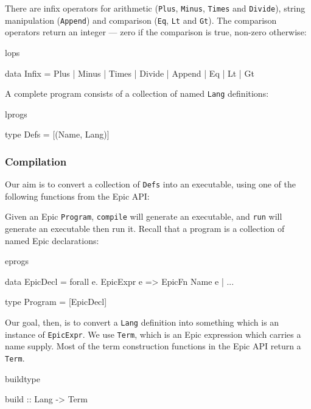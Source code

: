 \noindent
There are infix operators for arithmetic (\texttt{Plus},
\texttt{Minus}, \texttt{Times} and \texttt{Divide}), string
manipulation (\texttt{Append}) and comparison (\texttt{Eq},
\texttt{Lt} and \texttt{Gt}). The comparison operators return an
integer --- zero if the comparison is true, non-zero otherwise:

\begin{SaveVerbatim}{lops}

data Infix = Plus | Minus | Times | Divide | Append
           | Eq   | Lt    | Gt

\end{SaveVerbatim}

\noindent
A complete program consists of a collection of named \texttt{Lang}
definitions:

\begin{SaveVerbatim}{lprogs}

type Defs = [(Name, Lang)]

\end{SaveVerbatim}

\subsubsection{Compilation}

Our aim is to convert a collection of \texttt{Defs} into an
executable, using one of the following functions from the Epic API:


\noindent
Given an Epic \texttt{Program}, \texttt{compile} will generate an
executable, and \texttt{run} will generate an executable then run it.
Recall that a program is a collection of named Epic declarations:

\begin{SaveVerbatim}{eprogs}

data EpicDecl = forall e. EpicExpr e => EpicFn Name e
              | ...

type Program = [EpicDecl]

\end{SaveVerbatim}

Our goal, then, is to convert a \texttt{Lang} definition into
something which is an instance of \texttt{EpicExpr}. We use
\texttt{Term}, which is an Epic expression which carries a name
supply. Most of the term construction functions in the Epic API return
a \texttt{Term}.

\begin{SaveVerbatim}{buildtype}

build :: Lang -> Term

\end{SaveVerbatim}

